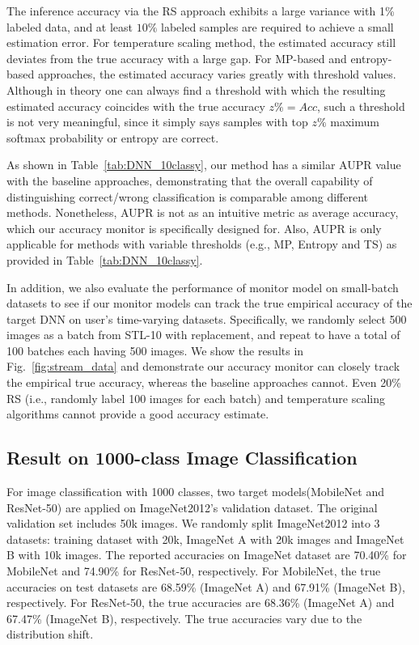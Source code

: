 \documentclass{article}
\newcommand{\cloudModels}{target models\xspace}
\newcommand{\monitorModel}{monitor model\xspace}
\begin{document}
The inference accuracy via the RS approach exhibits a large variance with 1\% labeled data, and at least $10\%$ labeled samples are required to achieve a small estimation error. For temperature scaling method, the estimated accuracy still deviates from the true accuracy with a large gap. For MP-based and entropy-based approaches, the estimated accuracy varies greatly with threshold values.
Although in theory one can always find a threshold with which
the resulting estimated accuracy coincides with the true accuracy $z\%=Acc$,
such a threshold is not very meaningful, since it simply says
samples with top  $z\%$ maximum softmax probability or entropy
are correct.


As shown in Table~\ref{tab:DNN_10classy}, our method has a similar AUPR value with the baseline
approaches, demonstrating that the
overall capability of distinguishing correct/wrong classification is
comparable among different methods. Nonetheless, AUPR is not
as
an intuitive metric as average accuracy, which our accuracy monitor is specifically designed for. Also, AUPR is only applicable for methods with variable thresholds (e.g., MP, Entropy and TS) as provided in Table~\ref{tab:DNN_10classy}.

In addition, we also evaluate the performance of \monitorModel on
small-batch datasets to see if our monitor models
can track the true empirical accuracy of the target DNN
on user's time-varying datasets. Specifically, we randomly select
500 images as a batch from STL-10 with replacement, and
repeat to have a total of 100 batches each having 500 images.
We show the results in Fig.~\ref{fig:stream_data}
and demonstrate our accuracy monitor can closely track
the empirical true accuracy, whereas the baseline approaches
cannot. Even 20\% RS (i.e., randomly label 100 images
for each batch) {and temperature scaling algorithms} cannot provide a good accuracy estimate.

\subsection{Result on 1000-class Image Classification}
For image classification with 1000 classes, two \cloudModels (MobileNet and ResNet-50) are applied on ImageNet2012's validation dataset. The original validation set includes 50k images. We randomly split ImageNet2012 into 3 datasets: training dataset with 20k, ImageNet A with 20k images and ImageNet B with 10k images. The reported accuracies on ImageNet dataset are 70.40\% for MobileNet and 74.90\% for ResNet-50, respectively. For MobileNet, the true accuracies on test datasets are 68.59\% (ImageNet A) and 67.91\% (ImageNet B), respectively. For ResNet-50, the true accuracies are 68.36\% (ImageNet A) and 67.47\% (ImageNet B), respectively. The true accuracies vary due to the  distribution shift.
\end{document}
